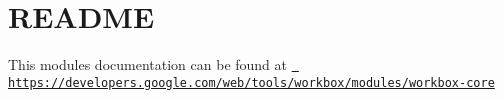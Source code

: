 \chapter{README}
\hypertarget{md_node__modules_2workbox-core_2README}{}\label{md_node__modules_2workbox-core_2README}
This module\textquotesingle{}s documentation can be found at \href{https://developers.google.com/web/tools/workbox/modules/workbox-core}{\texttt{ https\+://developers.\+google.\+com/web/tools/workbox/modules/workbox-\/core}} 